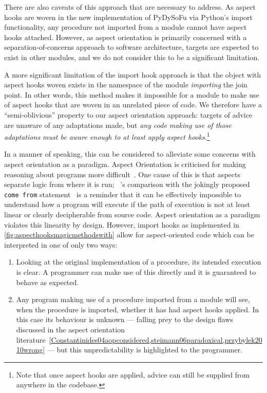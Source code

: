 There are also caveats of this approach that are necessary to address.
As aspect hooks are woven in the new implementation of PyDySoFu via Python's
import functionality, any procedure not imported from a module cannot have
aspect hooks attached. However, as
aspect orientation is primarily concerned with a separation-of-concerns approach
to software architecture, targets are expected to exist in other modules, and we
do not consider this to be a significant limitation.

A more significant limitation of the import hook approach is that the object
with aspect hooks woven exists in the namespace of the module \emph{importing}
the join point. In other words, this method makes it impossible for a module to
make use of aspect hooks that are woven in an unrelated piece of
code.
We therefore have a ``semi-oblivious'' property to our aspect orientation approach:
targets of advice are unaware of any adaptations made, but \emph{any code making
use of those adaptations must be aware enough to at least apply aspect
hooks}.\footnote{Note that once aspect hooks are applied, advice can still be
supplied from anywhere in the codebase.}

In a manner of speaking, this can be considered to alleviate some concerns with
aspect orientation as a paradigm. Aspect Orientation is criticised for making
reasoning about programs more
difficult~\cite{przybylek2010wrong,Constantinides04aopconsidered,steimann06paradoxical}.
One cause of this is that aspects separate logic from where it is run;
\citeauthor{Constantinides04aopconsidered}~'s comparison with the jokingly
proposed \lstinline{come from}
statement~\cite{clark73comefrom,Constantinides04aopconsidered} is a reminder
that it can be effectively impossible to understand how a program will execute
if the path of execution is not at least linear or clearly decipherable from
source code. Aspect orientation as a paradigm violates this
linearity by design. However, import hooks as implemented in
\cref{fig:aspecthooksmagicmethodswith} allow for aspect-oriented code which can be interpreted in
one of only two ways:

\begin{enumerate}
    \item Looking at the original implementation of a procedure, its intended
    execution is clear. A programmer can make use of this directly and it is
    guaranteed to behave as expected.
    \item Any program making use of a procedure imported from a module will see,
    when the procedure is imported, whether it has had aspect hooks applied. In
    this case its behaviour is unknown --- falling prey to the design flaws
    discussed in the aspect orientation
    literature~\cref{Constantinides04aopconsidered,steimann06paradoxical,przybylek2010wrong}
    --- but this unpredictability is highlighted to the
    programmer.
\end{enumerate}


